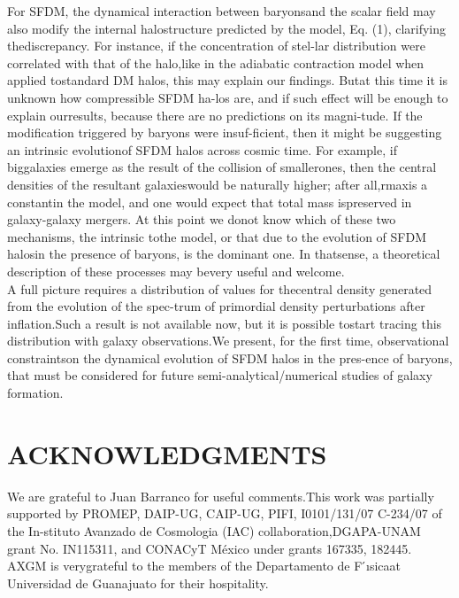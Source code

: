 \documentclass[10pt,a4paper]{article}
\begin{document}
\begin{multicols}{2}
\indent
For SFDM, the dynamical interaction between baryonsand  the  scalar  field  may  also  modify the  internal  halostructure predicted by the model, Eq. (1), clarifying thediscrepancy.   For  instance,  if  the  concentration  of  stel-lar  distribution  were  correlated  with  that  of  the  halo,like in the adiabatic contraction model when applied tostandard DM halos, this may explain our findings.  Butat this time it is unknown how compressible SFDM ha-los are, and if such effect will be enough to explain ourresults,  because  there  are  no  predictions  on  its  magni-tude. If the modification triggered by baryons were insuf-ficient, then it might be suggesting an intrinsic evolutionof SFDM halos across cosmic time.  For example, if biggalaxies  emerge  as  the  result  of  the  collision  of  smallerones, then the central densities of the resultant galaxieswould be naturally higher;  after all,rmaxis a constantin  the  model,  and  one  would  expect  that  total  mass  ispreserved in galaxy-galaxy mergers.  At this point we donot know which of these two mechanisms, the intrinsic tothe model, or that due to the evolution of SFDM halosin the presence of baryons, is the dominant one.  In thatsense, a theoretical description of these processes may bevery useful and welcome.\\
\indent
A full picture requires a distribution of values for thecentral density generated from the evolution of the spec-trum of primordial density perturbations after inflation.Such a result is not available now,  but it is possible tostart tracing this distribution with galaxy observations.We present, for the first time, observational constraintson the dynamical evolution of SFDM halos in the pres-ence of baryons, that must be considered for future semi-analytical/numerical studies of galaxy formation.

\section{\large\centering ACKNOWLEDGMENTS}
We are grateful to Juan Barranco for useful comments.This work was partially supported by PROMEP, DAIP-UG, CAIP-UG, PIFI, I0101/131/07 C-234/07 of the In-stituto  Avanzado  de  Cosmologia  (IAC)  collaboration,DGAPA-UNAM  grant  No.   IN115311,  and  CONACyT México  under  grants  167335,  182445.   AXGM  is  verygrateful to the members of the Departamento de F ́ısicaat Universidad de Guanajuato for their hospitality.






\end{multicols}
\end{document}
